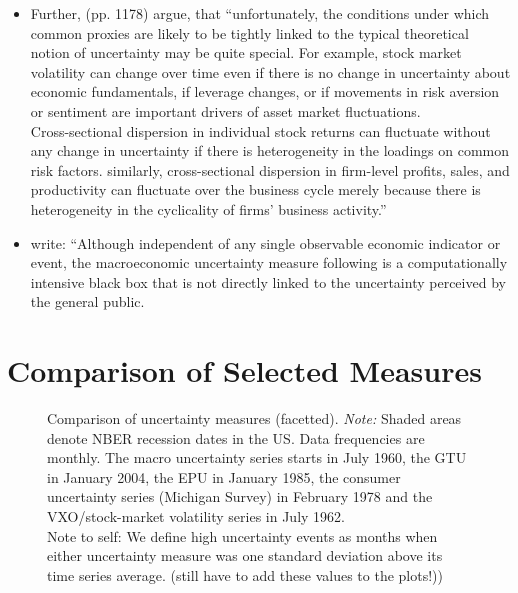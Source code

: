 \documentclass[a4paper,12pt,oneside,pointednumbers,bibtotoc,bigheadings,liststotoc]{scrbook}
\begin{document}
\begin{itemize}
	\item Further, \citet{juradoetal:15} (pp. 1178) argue, that ``unfortunately, the conditions under which common proxies are likely to be tightly linked to the typical theoretical notion of uncertainty may be quite special. For example, stock market volatility can change over time even if there is no change in uncertainty about economic fundamentals, if leverage changes, or if movements in risk aversion or sentiment are important drivers of asset market fluctuations.\\
Cross-sectional dispersion in individual stock returns can fluctuate without any change in uncertainty if there is heterogeneity in the loadings on common risk factors. similarly, cross-sectional dispersion in firm-level profits, sales, and productivity can fluctuate over the business cycle merely because there is heterogeneity in the cyclicality of firms' business activity.'' 
	\item \citet[p. 13]{bontempietal:16} write: ``Although independent of any single observable economic indicator or event, the macroeconomic uncertainty measure following \citet{juradoetal:15} is a computationally intensive black box that is not directly linked to the uncertainty perceived by the general public.  
\end{itemize}

\section{Comparison of Selected Measures}
\begin{figure}[!ht]
   \centering
   \setlength\fboxsep{0pt}
   \setlength\fboxrule{0pt}
      \caption[Comparison of uncertainty measures (facetted).]{Comparison of uncertainty measures (facetted).
      \textit{Note:} Shaded areas denote NBER recession dates in the US. Data frequencies are monthly. The macro uncertainty series starts in July 1960, the GTU in January 2004, the EPU in January 1985, the consumer uncertainty series (Michigan Survey) in February 1978 and the VXO/stock-market volatility series in July 1962.\\
      Note to self: We define high uncertainty events as months when either uncertainty measure was one standard deviation above its time series average. (still have to add these values to the plots!))}   \label{fig:comparison_plot}
\end{figure}
\end{document}
